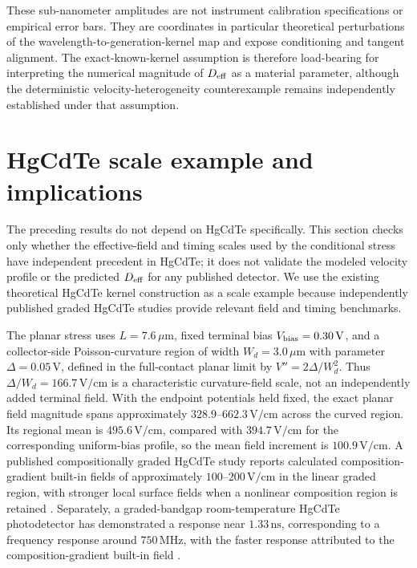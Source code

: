 \documentclass[aps,pra,twocolumn,superscriptaddress,nofootinbib]{revtex4-2}
\begin{document}
These sub-nanometer amplitudes are not instrument calibration specifications or empirical error bars. They are coordinates in particular theoretical perturbations of the wavelength-to-generation-kernel map and expose conditioning and tangent alignment. The exact-known-kernel assumption is therefore load-bearing for interpreting the numerical magnitude of $D_{\rm eff}$ as a material parameter, although the deterministic velocity-heterogeneity counterexample remains independently established under that assumption.

\section{HgCdTe scale example and implications}
\label{sec:hgcdte}

The preceding results do not depend on HgCdTe specifically.  This section checks only whether the effective-field and timing scales used by the conditional stress have independent precedent in HgCdTe; it does not validate the modeled velocity profile or the predicted $D_{\rm eff}$ for any published detector.  We use the existing theoretical HgCdTe kernel construction as a scale example because independently published graded HgCdTe studies provide relevant field and timing benchmarks.

The planar stress uses $L=7.6\,\mu\mathrm{m}$, fixed terminal bias $V_{\rm bias}=0.30\,\mathrm{V}$, and a collector-side Poisson-curvature region of width $W_d=3.0\,\mu\mathrm{m}$ with parameter $\Delta=0.05\,\mathrm{V}$, defined in the full-contact planar limit by $V''=2\Delta/W_d^2$.  Thus $\Delta/W_d=166.7\,\mathrm{V/cm}$ is a characteristic curvature-field scale, not an independently added terminal field.  With the endpoint potentials held fixed, the exact planar field magnitude spans approximately $328.9$--$662.3\,\mathrm{V/cm}$ across the curved region.  Its regional mean is $495.6\,\mathrm{V/cm}$, compared with $394.7\,\mathrm{V/cm}$ for the corresponding uniform-bias profile, so the mean field increment is $100.9\,\mathrm{V/cm}$. A published compositionally graded HgCdTe study reports calculated composition-gradient built-in fields of approximately $100$--$200\,\mathrm{V/cm}$ in the linear graded region, with stronger local surface fields when a nonlinear composition region is retained \cite{xu2023graded}. Separately, a graded-bandgap room-temperature HgCdTe photodetector has demonstrated a response near $1.33\,\mathrm{ns}$, corresponding to a frequency response around $750\,\mathrm{MHz}$, with the faster response attributed to the composition-gradient built-in field \cite{sang2022graded}.
\end{document}
